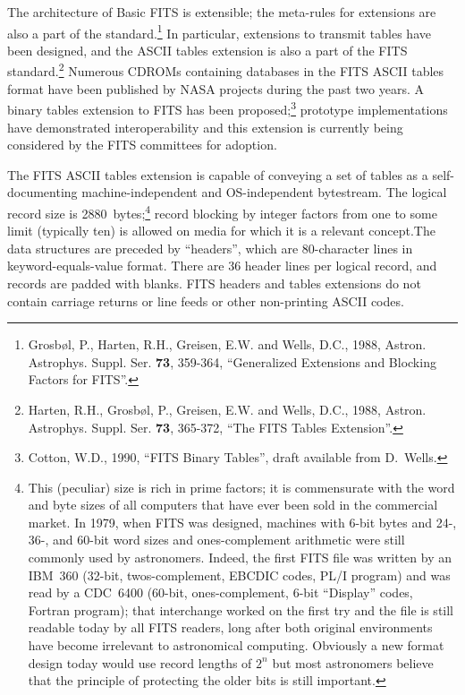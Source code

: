 The architecture of Basic FITS is extensible; the meta-rules for
extensions are also a part of the standard.\footnote{Grosb{\o}l, P.,
Harten, R.H., Greisen, E.W. and Wells, D.C., 1988, Astron. Astrophys.
Suppl. Ser. {\bf 73}, 359-364, ``Generalized Extensions and Blocking
Factors for FITS''.} In particular, extensions to transmit tables have
been designed, and the ASCII tables extension is also a part of the
FITS standard.\footnote{Harten, R.H., Grosb{\o}l, P., Greisen, E.W.
and Wells, D.C., 1988, Astron. Astrophys.  Suppl. Ser.  {\bf 73},
365-372, ``The FITS Tables Extension''.} Numerous CDROMs containing
databases in the FITS ASCII tables format have been published by NASA
projects during the past two years.  A binary tables extension to FITS
has been proposed;\footnote{Cotton, W.D., 1990, ``FITS Binary Tables'',
draft available from D.~Wells.} prototype implementations have
demonstrated interoperability and this extension is currently being
considered by the FITS committees for adoption.

The FITS ASCII tables extension is capable of conveying a set of
tables as a self-documenting machine-independent and OS-independent
bytestream. The logical record size is 2880~bytes;\footnote{This
(peculiar) size is rich in prime factors; it is commensurate with the
word and byte sizes of all computers that have ever been sold in the
commercial market. In 1979, when FITS was designed, machines with
6-bit bytes and 24-, 36-, and 60-bit word sizes and ones-complement
arithmetic were still commonly used by astronomers.  Indeed, the first
FITS file was written by an IBM~360 (32-bit, twos-complement, EBCDIC
codes, PL/I program) and was read by a CDC~6400 (60-bit,
ones-complement, 6-bit ``Display'' codes, Fortran program); that
interchange worked on the first try and the file is still readable
today by all FITS readers, long after both original environments have
become irrelevant to astronomical computing. Obviously a new format
design today would use record lengths of $2^{n}$ but most astronomers
believe that the principle of protecting the older bits is still
important.} record blocking by integer factors from one to some limit
(typically ten) is allowed on media for which it is a relevant
concept.\footnotemark[7] The data structures are preceded by
``headers'', which are 80-character lines in keyword-equals-value
format. There are 36 header lines per logical record, and records are
padded with blanks. FITS headers and tables extensions do not contain
carriage returns or line feeds or other non-printing ASCII codes.

